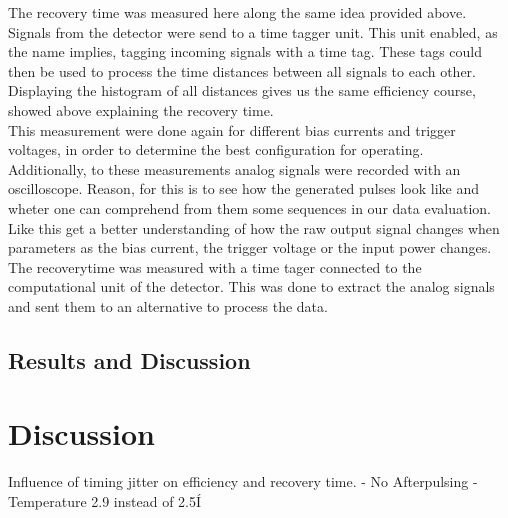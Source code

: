 The recovery time was measured here along the same idea provided above.
Signals from the detector were send to a time tagger unit.
This unit enabled, as the name implies, tagging incoming signals with a time tag.
These tags could then be used to process the time distances between all signals to each other.
Displaying the histogram of all distances gives us the same efficiency course, showed above explaining the recovery time.
\\
This measurement were done again for different bias currents and trigger voltages, in order to determine the best
configuration for operating. \\

Additionally, to these measurements analog signals were recorded with an oscilloscope.
Reason, for this is to see how the generated pulses look like and wheter one can comprehend from them some sequences in our
data evaluation.
Like this get a better understanding of how the raw output signal changes when parameters as the bias current, the trigger
voltage or the input power changes.\\






The recoverytime was measured with a time tager connected to the computational unit of the detector.
This was done to extract the analog signals and sent them to an alternative to process the data.

\subsection*{Results and Discussion}
\section{Discussion}
Influence of timing jitter on efficiency and recovery time.
- No Afterpulsing
- Temperature 2.9 instead of 2.5Í